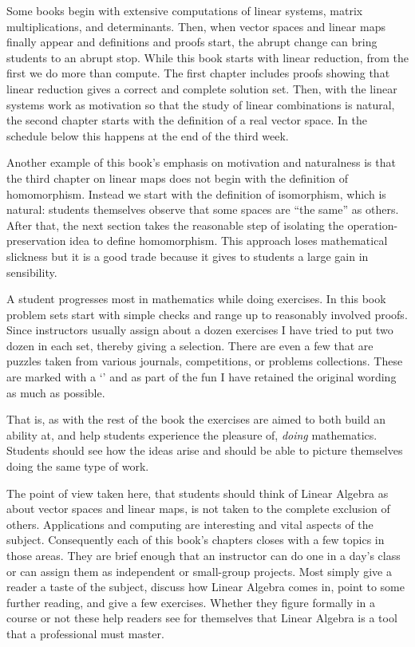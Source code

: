 {Some books
begin with extensive computations of linear systems, 
matrix multiplications, 
and determinants.
Then, when 
vector spaces and linear maps finally appear
and definitions and proofs start, the abrupt change
can bring students to an abrupt stop.
While this book starts with
linear reduction, from the first
we do more than compute.
The first chapter
includes proofs showing that linear reduction gives a correct and
complete solution set.
Then, with the linear systems work as motivation
so that the study of linear combinations is natural,
the second chapter starts with the definition of a real vector space.
In the schedule below this happens at the end of the third week.

Another example of this book's emphasis on motivation and naturalness
is that the third chapter on linear maps
does not begin with the definition of homomorphism.
Instead we start with the definition of isomorphism, which
is natural: students themselves
observe that some spaces are ``the same'' as others.
After that,
the next section takes the reasonable step of 
isolating the operation-preservation idea
to define homomorphism.
This approach loses mathematical slickness 
but it is a good trade because it gives to students
a large gain in sensibility.

A student progresses most in mathematics while doing exercises. 
In this book problem sets start with 
simple checks and range up to reasonably involved proofs.
Since instructors usually assign about a dozen exercises
I have tried to put two dozen in each set, 
thereby giving a selection.
There are even a few that are puzzles
taken from various journals, competitions, or
problems collections. 
These are marked with a
`\puzzlemark' and 
as part of the fun I have retained the original wording
as much as possible.

That is, as with the rest of the book 
the exercises are aimed to both build an ability at,
and help students experience the pleasure of, 
\emph{doing} mathematics.
Students should see how the ideas arise and should be able to 
picture themselves doing the same type of work.


\medskip
{}
The point of view taken here, that students should think of 
Linear Algebra as about vector spaces
and linear maps, is not taken to the complete exclusion of others.
Applications and computing are interesting and vital aspects 
of the subject.
Consequently each of this book's chapters closes with a few 
topics in those areas.
They are brief enough that an instructor can do one
in a day's class 
or can assign them as independent or small-group projects.
Most simply give a reader
a taste of the subject, discuss how Linear Algebra comes in,
point to some further reading, and give a few exercises. 
Whether they figure formally in a course or not these help
readers see for themselves that Linear Algebra is a tool
that a professional must master. 




}
